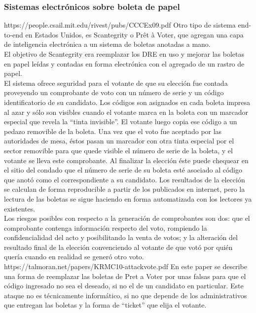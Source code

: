 \subsubsection{Sistemas electrónicos sobre boleta de papel}
https://people.csail.mit.edu/rivest/pubs/CCCEx09.pdf
Otro tipo de sistema end-to-end en Estados Unidos, es Scantegrity o Prêt à Voter, que agregan una capa de inteligencia electrónica a un sistema de boletas anotadas a mano. \\
El objetivo de Scantegrity era reemplazar los DRE en uso y mejorar las boletas en papel leídas y contadas en forma electrónica con el agregado de un rastro de papel. \\
El sistema ofrece seguridad para el votante de que su elección fue contada proveyendo un comprobante de voto con un número de serie y un código identificatorio de su candidato. Los códigos son asignados en cada boleta impresa al azar y sólo son visibles cuando el votante marca en la boleta con un marcador especial que revela la “tinta invisible”. El votante luego copia ese código a un pedazo removible de la boleta. Una vez que el voto fue aceptado por las autoridades de mesa, éstos pasan un marcador con otra tinta especial por el sector removible para que quede visible el número de serie de la boleta, y el votante se lleva este comprobante. Al finalizar la elección éste puede chequear en el sitio del condado que el número de serie de su boleta esté asociado al código que anotó como el correspondiente a su candidato. Los resultados de la elección se calculan de forma reproducible a partir de los publicados en internet, pero la lectura de las boletas se sigue haciendo en forma automatizada con los lectores ya existentes.\\

Los riesgos posibles con respecto a la generación de comprobantes son dos: que el comprobante contenga información respecto del voto, rompiendo la confidencialidad del acto y posibilitando la venta de votos; y la alteración del resultado final de la elección convenciendo al votante de que votó por quién quería cuando en realidad se generó otro voto.
https://talmoran.net/papers/KRMC10-attackvote.pdf En este paper se describe una forma de reemplazar las boletas de Pret a Voter por unas falsas para que el código ingresado no sea el deseado, si no el de un candidato en particular. Este ataque no es técnicamente informático, si no que depende de los administrativos que entregan las boletas y la forma de “ticket” que elija el votante.\\



